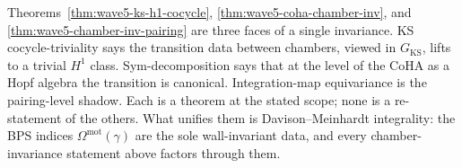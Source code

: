 \begin{remark}
\label{rem:wave5-three-chamber-invariances}
Theorems~\ref{thm:wave5-ks-h1-cocycle},
\ref{thm:wave5-coha-chamber-inv}, and
\ref{thm:wave5-chamber-inv-pairing} are three faces of a single
invariance. KS cocycle-triviality says the transition data between
chambers, viewed in $G_{\mathrm{KS}}$, lifts to a trivial $H^1$
class. Sym-decomposition says that at the level of the CoHA as a
Hopf algebra the transition is canonical. Integration-map
equivariance is the pairing-level shadow. Each is a theorem at the
stated scope; none is a re-statement of the others. What unifies them
is Davison--Meinhardt integrality: the BPS indices
$\Omega^{\mathrm{mot}}(\gamma)$ are the sole wall-invariant data, and
every chamber-invariance statement above factors through them.
\end{remark}

